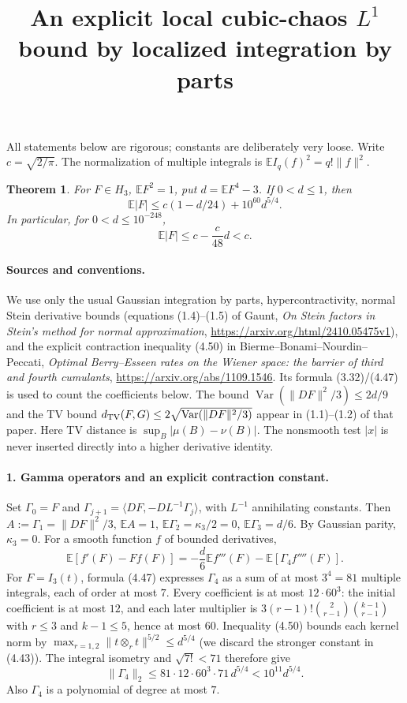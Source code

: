\documentclass[11pt]{article}
\newcommand{\E}{\mathbb E}\newcommand{\Pp}{\mathbb P}\newcommand{\Ga}{\Gamma}
\newtheorem{theorem}{Theorem}\newtheorem{lemma}{Lemma}
\begin{document}
\title{An explicit local cubic-chaos $L^1$ bound by localized integration by parts}
\author{}\date{}\maketitle
All statements below are rigorous; constants are deliberately very loose.
Write $c=\sqrt{2/\pi}$. The normalization of multiple integrals is
$\E I_q(f)^2=q!\|f\|^2$.

\begin{theorem}
For $F\in H_3$, $\E F^2=1$, put $d=\E F^4-3$. If $0<d\le1$, then
\[
 \E|F|\le c(1-d/24)+10^{60}d^{5/4}.
\]
In particular, for $0<d\le10^{-248}$,
\[
 \E|F|\le c-\frac{c}{48}d<c.
\]
\end{theorem}

\paragraph{Sources and conventions.}
We use only the usual Gaussian integration by parts, hypercontractivity,
normal Stein derivative bounds (equations (1.4)--(1.5) of Gaunt,
\emph{On Stein factors in Stein's method for normal approximation},
\url{https://arxiv.org/html/2410.05475v1}), and the explicit contraction inequality
(4.50) in Bierme--Bonami--Nourdin--Peccati,
\emph{Optimal Berry--Esseen rates on the Wiener space: the barrier of third and fourth cumulants},
\url{https://arxiv.org/abs/1109.1546}.
Its formula (3.32)/(4.47) is used to count the coefficients below.
The bound $\operatorname{Var}(\|DF\|^2/3)\le 2d/9$ and the TV bound
$d_{\rm TV}(F,G)\le2\sqrt{\operatorname{Var}(\|DF\|^2/3)}$
appear in (1.1)--(1.2) of that paper. Here TV distance is $\sup_B|\mu(B)-\nu(B)|$.
The nonsmooth test $|x|$ is never inserted directly into a higher derivative identity.

\paragraph{1. Gamma operators and an explicit contraction constant.}
Set $\Ga_0=F$ and
$\Ga_{j+1}=\langle DF,-DL^{-1}\Ga_j\rangle$, with $L^{-1}$ annihilating constants.
Then $A:=\Ga_1=\|DF\|^2/3$, $\E A=1$,
$\E\Ga_2=\kappa_3/2=0$, $\E\Ga_3=d/6$.
By Gaussian parity, $\kappa_3=0$. For a smooth function $f$ of bounded derivatives,
\begin{equation}\label{expansion}
\E[f'(F)-Ff(F)]= -\frac d6\E f'''(F)-\E[\Ga_4 f''''(F)].
\end{equation}
For $F=I_3(t)$, formula (4.47) expresses $\Ga_4$ as a sum of at most $3^4=81$
multiple integrals, each of order at most $7$. Every coefficient is at most
$12\cdot60^3$: the initial coefficient is at most $12$, and each later multiplier
is $3(r-1)!\binom2{r-1}\binom{k-1}{r-1}$ with $r\le3$ and $k-1\le5$,
hence at most $60$. Inequality (4.50) bounds each kernel norm by
$\max_{r=1,2}\|t\otimes_rt\|^{5/2}\le d^{5/4}$ (we discard the stronger constant in (4.43)).
The integral isometry and $\sqrt{7!}<71$ therefore give
\begin{equation}\label{gamma_bound}
 \|\Ga_4\|_2\le81\cdot12\cdot60^3\cdot71\,d^{5/4}<10^{11}d^{5/4}.
\end{equation}
Also $\Ga_4$ is a polynomial of degree at most $7$.
\end{document}
